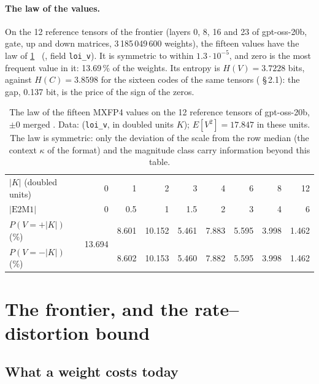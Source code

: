 \paragraph{The law of the values.} On the 12 reference tensors of the frontier (layers 0, 8, 16 and 23 of gpt-oss-20b, gate, up and down matrices, 3\,185\,049\,600 weights), the fifteen values have the law of \cref{t3que:tab:loi} \mes~(, field \texttt{loi\_v}). It is symmetric to within $1.3\cdot 10^{-5}$, and zero is the most frequent value in it: 13.69\,\% of the weights. Its entropy is $H(V) = 3.7228$ bits, against $H(C) = 3.8598$ for the sixteen codes of the same tensors ( §\,2.1): the gap, 0.137 bit, is the price of the sign of the zeros.

\begin{table}[tbp]
\centering\small
\begin{tabular}{l *{8}{r}}
\toprule
$|K|$ (doubled units) & 0 & 1 & 2 & 3 & 4 & 6 & 8 & 12 \\
$|\mathrm{E2M1}|$ & 0 & 0.5 & 1 & 1.5 & 2 & 3 & 4 & 6 \\
\midrule
$P(V = +|K|)$ (\%) & \multirow{2}{*}{13.694} & 8.601 & 10.152 & 5.461 & 7.883 & 5.595 & 3.998 & 1.462 \\
$P(V = -|K|)$ (\%) & & 8.602 & 10.153 & 5.460 & 7.882 & 5.595 & 3.998 & 1.462 \\
\bottomrule
\end{tabular}
\caption[The law of the fifteen MXFP4 values]{The law of the fifteen MXFP4 values on the 12 reference tensors of gpt-oss-20b, $\pm0$ merged \mes. Data:  (\texttt{loi\_v}, in doubled units $K$); $E[V^2] = 17.847$ in these units. The law is symmetric: only the deviation of the scale from the row median (the context $\kappa$ of the format) and the magnitude class carry information beyond this table.}
\label{t3que:tab:loi}
\end{table}

\section{The frontier, and the rate--distortion bound}\label{t3que:sec:frontiere}

\subsection{What a weight costs today}

